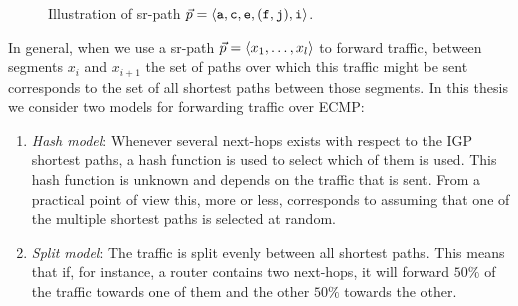 \begin{figure}
\begin{center}
\end{center}
\caption{Illustration of sr-path $\vec{p} = \langle \texttt{a}, \texttt{c}, \texttt{e}, (\texttt{f}, \texttt{j}), \texttt{i} \rangle$.}
\label{fig:sr-path}
\end{figure}


In general, when we use a sr-path $\vec{p} = \langle x_1, \ldots, x_l \rangle$ to forward traffic, between segments $x_i$ and $x_{i + 1}$ the set of paths
over which this traffic might be sent corresponds to the set of all shortest paths between those segments. In this thesis we consider two models for
forwarding traffic over ECMP:

\begin{enumerate}
 \item \emph{Hash model}: Whenever several next-hops exists with respect to the IGP shortest paths, a hash function is used to select which of them is used.
 This hash function is unknown and depends on the traffic that is sent. From a practical point of view this, more or less, corresponds to assuming that one of the
 multiple shortest paths is selected at random.
 
 \item \emph{Split model}: The traffic is split evenly between all shortest paths. This means that if, for instance, a router contains two next-hops, it will forward
 $50\%$ of the traffic towards one of them and the other $50\%$ towards the other.
\end{enumerate}


